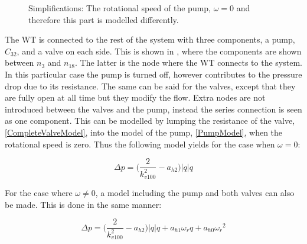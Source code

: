 \begin{figure}[H]
\centering
   
  \label{fig:subsys_1}
%   
\caption{Simplifications: The rotational speed of the pump, $\omega = 0$ and therefore this part is modelled differently.}
\end{figure}

The WT is connected to the rest of the system with three components, a pump, $C_{32}$, and a valve on each side. This is shown in , where the components are shown between $n_3$ and $n_{18}$. 
The latter is the node where the WT connects to the system. In this particular case the pump is turned off, however contributes to the pressure drop due to its resistance. The same can be said for the valves, except that they are fully open at all time but they modify the flow. Extra nodes are not introduced between the valves and the pump, instead the series connection is seen as one component. This can be modelled by lumping the resistance of the valve, \eqref{CompleteValveModel}, into the model of the pump, \eqref{PumpModel}, when the rotational speed is zero. Thus the following model yields for the case when $\omega = 0$:

\begin{equation}
  \Delta p = \Big(\frac{2}{k_{v100}^2} - a_{h2}\Big)|q| q 
  \label{omega_zero}
\end{equation}

For the case where $\omega \neq 0$, a model including the pump and both valves can also be made. This is done in the same manner: 

\begin{equation}
  \Delta p = \Big(\frac{2}{k_{v100}^2} - a_{h2}\Big)|q| q  + a_{h1} \omega_r q + a_{h0}{\omega_r}^2
  \label{omega_notzero}
\end{equation}

